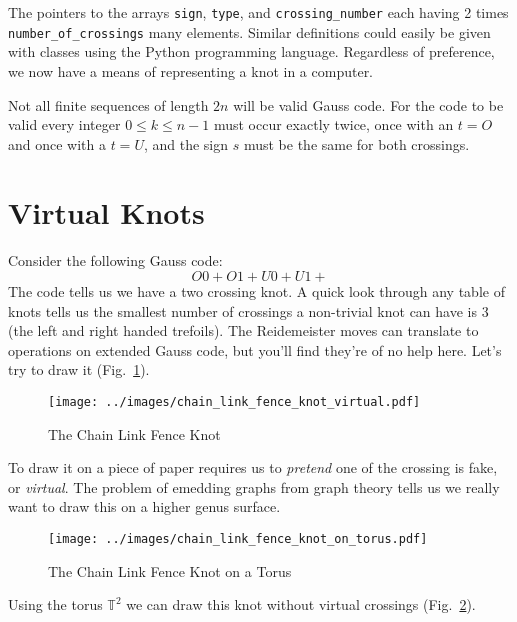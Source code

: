 \documentclass{article}
\theoremstyle{plain}
\begin{document}
        The pointers to the arrays \texttt{sign}, \texttt{type}, and
        \texttt{crossing\_number} each having 2 times
        \texttt{number\_of\_crossings} many elements.
        Similar definitions could easily be given with classes using the
        Python programming language. Regardless of preference, we now have a
        means of representing a knot in a computer.
        \par\hfill\par
        Not all finite sequences of length $2n$ will be valid Gauss code. For
        the code to be valid every integer $0\leq{k}\leq{n-1}$ must occur
        exactly twice, once with an $t=O$ and once with a $t=U$, and the sign
        $s$ must be the same for both crossings.
    \section{Virtual Knots}
        Consider the following Gauss code:
        \begin{equation}
            O0+O1+U0+U1+
        \end{equation}
        The code tells us we have a two crossing knot. A quick look through any
        table of knots tells us the smallest number of crossings a non-trivial
        knot can have is 3 (the left and right handed trefoils). The
        Reidemeister moves can translate to operations on extended Gauss code,
        but you'll find they're of no help here. Let's try to draw it
        (Fig.~\ref{fig:chain_link_fence_knot}).
        \begin{figure}
            \centering
            \texttt{[image: ../images/chain\_link\_fence\_knot\_virtual.pdf]}
            \caption{The Chain Link Fence Knot}
            \label{fig:chain_link_fence_knot}
        \end{figure}
        To draw it on a piece of paper requires us to \textit{pretend} one of
        the crossing is fake, or \textit{virtual}. The problem of emedding
        graphs from graph theory tells us we really want to draw this on a
        higher genus surface.
        \begin{figure}
            \centering
            \texttt{[image: ../images/chain\_link\_fence\_knot\_on\_torus.pdf]}
            \caption{The Chain Link Fence Knot on a Torus}
            \label{fig:chain_link_fence_knot_on_torus}
        \end{figure}
        Using the torus $\mathbb{T}^{2}$ we can draw this knot without virtual
        crossings (Fig.~\ref{fig:chain_link_fence_knot_on_torus}).
\end{document}
